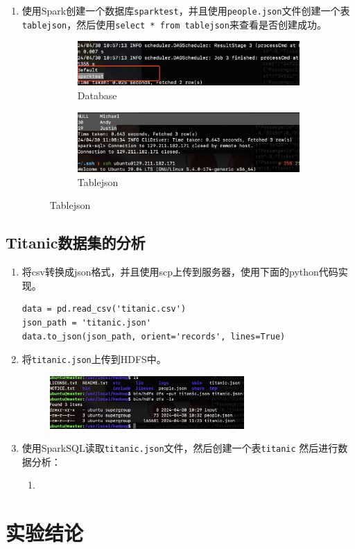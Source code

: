 \documentclass{article}
\begin{document}
\begin{enumerate}
\begin{figure}[H]
    \end{figure}
    \item 使用Spark创建一个数据库\texttt{sparktest}，并且使用\texttt{people.json}文件创建一个表
    \texttt{tablejson}，然后使用\texttt{select * from tablejson}来查看是否创建成功。
    \begin{figure}[H]
        \begin{subfigure}{0.5\textwidth}
            \centering
            \includegraphics[width=\textwidth]{databases.png}
            \caption*{Database}
        \end{subfigure}
        \hfill
        \begin{subfigure}{0.45\textwidth}
            \centering
            \includegraphics[width=\textwidth]{table.png}
            \caption*{Tablejson}
        \end{subfigure}
    \end{figure}
\end{enumerate}
\subsection{Titanic数据集的分析}
\begin{enumerate}
    \item 将csv转换成json格式，并且使用scp上传到服务器，使用下面的python代码实现。
    \begin{lstlisting}[style=pythonstyle]
data = pd.read_csv('titanic.csv')
json_path = 'titanic.json'
data.to_json(json_path, orient='records', lines=True)
    \end{lstlisting}
    \item 将\texttt{titanic.json}上传到HDFS中。
    \begin{figure}
        \centering
        \includegraphics[width=0.7\textwidth]{uploadtitanic.png}
    \end{figure}
    \item 使用SparkSQL读取\texttt{titanic.json}文件，然后创建一个表\texttt{titanic}
    然后进行数据分析：
    \begin{enumerate}
        \item 
    \end{enumerate}
    
\end{enumerate}
\section{实验结论}
\end{document}
